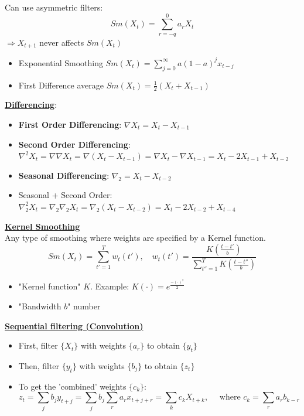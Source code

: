 Can use asymmetric filters:
\[Sm(X_t)=\sum_{r=-q}^0 a_r X_t\]
$\Rightarrow X_{t+1}$ never affects $Sm(X_t)$
\begin{itemize}
    \item Exponential Smoothing $Sm(X_t)=\sum_{j=0}^\infty a(1-a)^j x_{t-j}$
    \item First Difference average $Sm(X_t)=\frac{1}{2}(X_t+X_{t-1})$
\end{itemize}


\textbf{\underline{Differencing}}:
\begin{itemize}
    \item \textbf{First Order Differencing}: $\nabla X_t = X_t - X_{t-1}$
    \item \textbf{Second Order Differencing}: $\nabla^2 X_t = \nabla \nabla X_t = \nabla (X_t- X_{t-1}) = \nabla X_t - \nabla X_{t-1} = X_t - 2X_{t-1} + X_{t-2}$
    \item \textbf{Seasonal Differencing}: $\nabla_2 = X_t - X_{t-2}$
    \item Seasonal + Second Order: $\nabla^2_2 X_t= \nabla_2 \nabla_2 X_t = \nabla_2 (X_t-X_{t-2}) = X_t - 2X_{t-2} + X_{t-4} $
\end{itemize}

\textbf{\underline{Kernel Smoothing}}\\

Any type of smoothing where weights are specified by a Kernel function. 
\[Sm(X_t)=\sum_{t'=1}^T w_t(t'), \quad w_t(t')= \frac{K\left(\frac{t-t'}{b} \right)}{\sum_{t''=1}^T K\left( \frac{t-t''}{b}\right)}\]

\begin{itemize}
    \item "Kernel function" $K$. \quad Example: $K(\cdot)=e^{\frac{-(\cdot)^2}{2}}$
    \item "Bandwidth $b$" number 
\end{itemize}

\textbf{\underline{Sequential filtering (Convolution)}}

\bigskip

\begin{itemize}
    \item First, filter $\{X_t\}$ with weights $\{a_r\}$ to obtain $\{y_t\}$
    \item Then, filter $\{y_t\}$ with weights $\{b_j\}$ to obtain $\{z_t\}$
    \item To get the 'combined' weights $\{c_k\}$:
        \[
        z_t=\sum_j b_j y_{t+j}=\sum_jb_j \sum_r a_r x_{t+j+r} = \sum_k c_k X_{t+k}, \quad \text{ where } c_k=\sum_r a_r b_{k-r}
        \]
\end{itemize}

